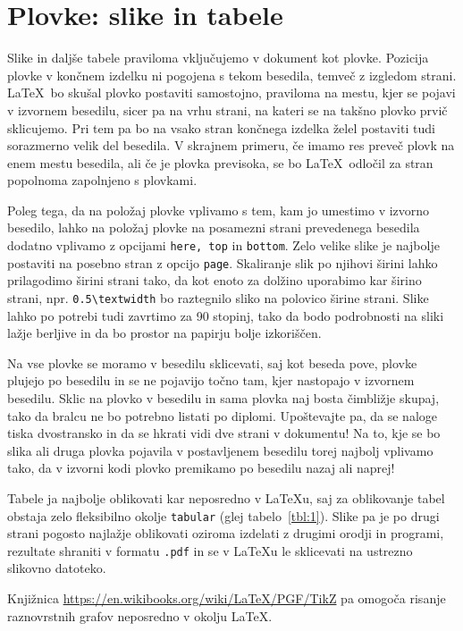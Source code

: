 \documentclass[a4paper, 12pt]{book}
\begin{document}
\chapter{Plovke: slike in tabele}
\label{ch2}

Slike in daljše tabele praviloma vključujemo v dokument kot plovke. 
Pozicija plovke v končnem izdelku ni pogojena s tekom besedila, temveč z izgledom strani. 
\LaTeX\ bo skušal plovko postaviti samostojno, praviloma na mestu, kjer se pojavi v izvornem besedilu, sicer pa na 
vrhu strani, na kateri se na takšno plovko prvič sklicujemo. 
Pri tem pa bo na vsako stran končnega izdelka želel postaviti tudi sorazmerno velik del besedila. 
V skrajnem primeru, če imamo res preveč plovk na enem mestu besedila, ali če je plovka previsoka, se bo \LaTeX\ odločil za stran popolnoma zapolnjeno s plovkami.

Poleg tega, da na položaj plovke vplivamo s tem, kam jo umestimo v izvorno besedilo, lahko na položaj plovke na posamezni strani prevedenega besedila dodatno vplivamo z opcijami \texttt{here, top} in \texttt{bottom}.
Zelo velike slike je najbolje postaviti na posebno stran z opcijo \texttt{page}.
Skaliranje slik po njihovi širini lahko prilagodimo širini strani tako, da kot enoto za dolžino uporabimo kar širino strani, npr. \verb=0.5\textwidth= bo raztegnilo sliko na polovico širine strani.
Slike lahko po potrebi tudi zavrtimo za 90 stopinj, tako da bodo podrobnosti na sliki lažje berljive in da bo prostor na papirju bolje izkoriščen.

Na vse plovke se moramo v besedilu sklicevati, saj kot beseda pove, plovke plujejo po besedilu in se ne pojavijo točno tam, kjer nastopajo v izvornem besedilu.
Sklic na plovko v besedilu in sama plovka naj bosta čimbližje skupaj, tako da bralcu ne bo potrebno listati po diplomi. 
Upoštevajte pa, da se naloge tiska dvostransko in da se hkrati vidi dve strani v dokumentu!
Na to, kje se bo slika ali druga plovka pojavila v postavljenem besedilu torej najbolj vplivamo tako, da v izvorni kodi plovko premikamo po besedilu nazaj ali naprej!

Tabele ja najbolje oblikovati kar neposredno v \LaTeX u, saj za oblikovanje tabel obstaja zelo fleksibilno okolje \texttt{tabular} (glej tabelo~\ref{tbl:1}).
Slike pa je po drugi strani  pogosto najla\v zje oblikovati oziroma izdelati z drugimi orodji in programi, rezultate shraniti v formatu {\tt .pdf}  in se v \LaTeX u le sklicevati na ustrezno slikovno datoteko.

Knjižnica \url{https://en.wikibooks.org/wiki/LaTeX/PGF/TikZ} 
pa omo\-go\-ča risanje raznovrstnih grafov neposredno v okolju \LaTeX .
\end{document}
